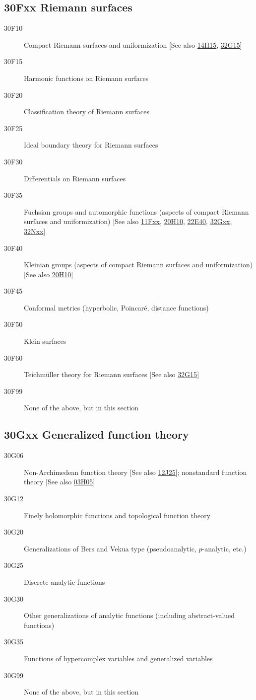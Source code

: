\documentclass[letterpaper]{article}
\begin{document}
\subsection*{30Fxx  Riemann surfaces }\label{30Fxx}
\begin{description}  
\item [30F10]\label{30F10} Compact Riemann surfaces and uniformization [See also \hyperref[14H15]{14H15}, \hyperref[32G15]{32G15}]
\item [30F15]\label{30F15} Harmonic functions on Riemann surfaces
\item [30F20]\label{30F20} Classification theory of Riemann surfaces
\item [30F25]\label{30F25} Ideal boundary theory for Riemann surfaces
\item [30F30]\label{30F30} Differentials on Riemann surfaces
\item [30F35]\label{30F35} Fuchsian groups and automorphic functions (aspects of compact Riemann surfaces and uniformization) [See also \hyperref[11Fxx]{11Fxx}, \hyperref[20H10]{20H10}, \hyperref[22E40]{22E40}, \hyperref[32Gxx]{32Gxx}, \hyperref[32Nxx]{32Nxx}]
\item [30F40]\label{30F40} Kleinian groups (aspects of compact Riemann surfaces and uniformization) [See also \hyperref[20H10]{20H10}]
\item [30F45]\label{30F45} Conformal metrics (hyperbolic, Poincar\'{e}, distance functions)
\item [30F50]\label{30F50} Klein surfaces
\item [30F60]\label{30F60} Teichm\"{u}ller theory for Riemann surfaces [See also \hyperref[32G15]{32G15}]
\item [30F99]\label{30F99} None of the above, but in this section
\end{description}
\subsection*{30Gxx  Generalized function theory }\label{30Gxx}
\begin{description}  
\item [30G06]\label{30G06} Non-Archimedean function theory [See also \hyperref[12J25]{12J25}]; nonstandard function theory [See also \hyperref[03H05]{03H05}]
\item [30G12]\label{30G12} Finely holomorphic functions and topological function theory
\item [30G20]\label{30G20} Generalizations of Bers and  Vekua type (pseudoanalytic, $p$-analytic, etc.)
\item [30G25]\label{30G25} Discrete analytic functions
\item [30G30]\label{30G30} Other generalizations of analytic functions (including abstract-valued functions)
\item [30G35]\label{30G35} Functions of hypercomplex variables and generalized variables
\item [30G99]\label{30G99} None of the above, but in this section
\end{description}
\end{document}
